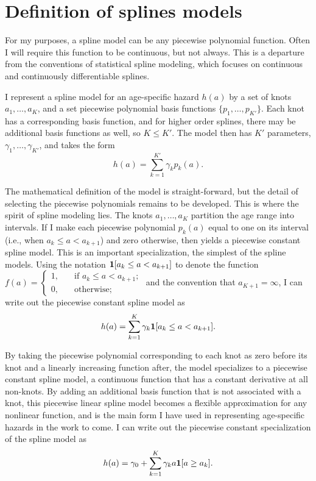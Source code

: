 \section{Definition of splines models}

For my purposes, a spline model can be any piecewise polynomial
function.  Often I will require this function to be continuous, but
not always.  This is a departure from the conventions of statistical
spline modeling, which focuses on continuous and continuously
differentiable splines.  

I represent a spline model for an age-specific hazard $h(a)$ by a set
of knots $a_1,\dots,a_{K}$, and a set piecewise polynomial basis
functions $\{p_1,\ldots,p_{K'}\}$.  Each knot has a corresponding
basis function, and for higher order splines, there may be additional
basis functions as well, so $K \leq K'$.  The model then has $K'$
parameters, $\gamma_1,\ldots,\gamma_{K'}$, and takes the form
\[
h(a) = \sum_{k=1}^{K'} \gamma_k p_k(a).
\]

The mathematical definition of the model is straight-forward, but the
detail of selecting the piecewise polynomials remains to be developed.
This is where the spirit of spline modeling lies. The knots $a_1,
\dots, a_{K}$ partition the age range into intervals. If I make each
piecewise polynomial $p_k(a)$ equal to one on its interval (i.e., when
$a_k \leq a < a_{k+1}$) and zero otherwise, then yields a piecewise
constant spline model.  This is an important specialization, the
simplest of the spline models.  Using the notation $\mathbf{1}[a_k \leq a <
  a_{k+1}]$ to denote the function $f(a)
= \begin{cases}1,&\quad\text{if }a_k \leq a <
  a_{k+1};\\0,&\quad\text{otherwise;}\end{cases}$ and the convention
that $a_{K+1} = \infty$, I can write out the piecewise constant spline
model as
\[
h(a) = \sum_{k=1}^K \gamma_k \mathbf{1}[a_k \leq a < a_{k+1}].
\]

By taking the piecewise polynomial corresponding to each knot as zero
before its knot and a linearly increasing function after, the model
specializes to a piecewise constant spline model, a continuous
function that has a constant derivative at all non-knots.  By adding
an additional basis function that is not associated with a knot, this
piecewise linear spline model becomes a flexible approximation for any
nonlinear function, and is the main form I have used in representing
age-specific hazards in the work to come.  I can write out the
piecewise constant specialization of the spline model as
\[
h(a) = \gamma_0 + \sum_{k=1}^K \gamma_k a \mathbf{1}[a \geq a_k].
\]

